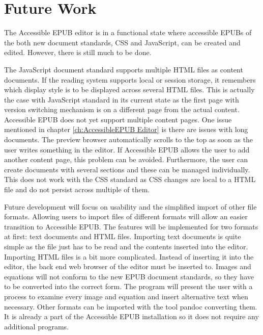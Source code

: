 
\chapter{Future Work}
\label{ch:FutureWork}
%
The Accessible EPUB editor is in a functional state where accessible EPUBs of the both new document standards, CSS and JavaScript, can be created and edited. However, there is still much to be done.

The JavaScript document standard supports multiple HTML files as content documents. If the reading system supports local or session storage, it remembers which display style is to be displayed across several HTML files. This is actually the case with JavaScript standard in its current state as the first page with version switching mechanism is on a different page from the actual content. Accessible EPUB does not yet support multiple content pages. One issue mentioned in chapter \ref{ch:AccessibleEPUB Editor} is there are issues with long documents. The preview browser automatically scrolls to the top as soon as the user writes something in the editor. If Accessible EPUB allows the user to add another content page, this problem can be avoided. Furthermore, the user can create documents with several sections and these can be managed individually. This does not work with the CSS standard as CSS changes are local to a HTML file and do not persist across multiple of them.

Future development will focus on usability and the simplified import of other file formats. Allowing users to import files of different formats will allow an easier transition to Accessible EPUB. The features will be implemented for two formats at first: text documents and HTML files. Importing text documents is quite simple as the file just has to be read and the contents inserted into the editor. Importing HTML files is a bit more complicated. Instead of inserting it into the editor, the back end web browser of the editor must be inserted to. Images and equations will not conform to the new EPUB document standards, so they have to be converted into the correct form. The program will present the user with a process to examine every image and equation and insert alternative text when necessary. Other formats can be imported with the tool pandoc converting them. It is already a part of the Accessible EPUB installation so it does not require any additional programs.

